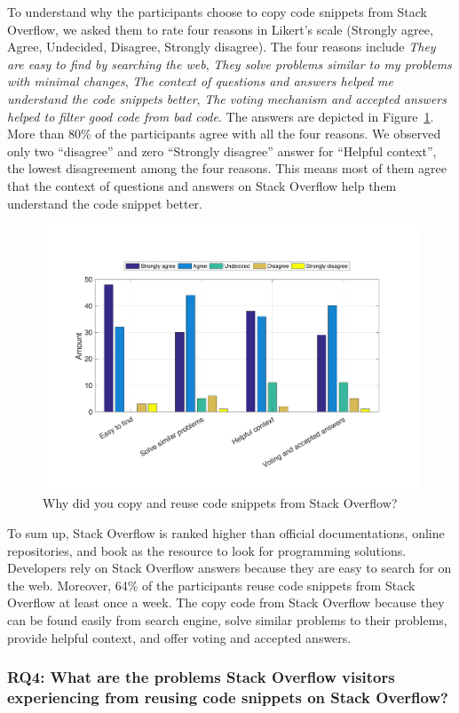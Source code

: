 \documentclass{svjour3}                     %
\begin{document}
To understand why the participants choose to copy code snippets from Stack
Overflow, we asked them to rate four reasons in Likert's scale (Strongly agree,
Agree, Undecided, Disagree, Strongly disagree). The four reasons include
\textit{They are easy to find by searching the web}, \textit{They solve problems
	similar to my problems with minimal changes}, \textit{The context of questions
	and answers helped me understand the code snippets better}, \textit{The voting
	mechanism and accepted answers helped to filter good code from bad code}. The
answers are depicted in Figure~\ref{fig:survey_visitor_why_copy_so}. More than
80\% of the participants agree with all the four reasons. We observed only two
``disagree'' and zero ``Strongly disagree'' answer for ``Helpful context'', the
lowest disagreement among the four reasons. This means most of them agree that
the context of questions and answers on Stack Overflow help them understand the
code snippet better.

\begin{figure} \centering
	\includegraphics[width=0.6\linewidth]{survey_visitor_why_copy_so} 
	\caption{Why did you copy and reuse code snippets from Stack Overflow?}
	\label{fig:survey_visitor_why_copy_so} 
\end{figure}

To sum up, Stack Overflow is ranked higher than official documentations, online
repositories, and book as the resource to look for programming solutions.
Developers rely on Stack Overflow answers because they are easy to search for on
the web. Moreover, 64\% of the participants reuse code snippets from Stack
Overflow at least once a week. The copy code from Stack Overflow because they
can be found easily from search engine, solve similar problems to their
problems, provide helpful context, and offer voting and accepted answers.

\subsubsection*{RQ4: What are the problems Stack Overflow visitors experiencing
	from reusing code snippets on Stack Overflow?}
\end{document}
